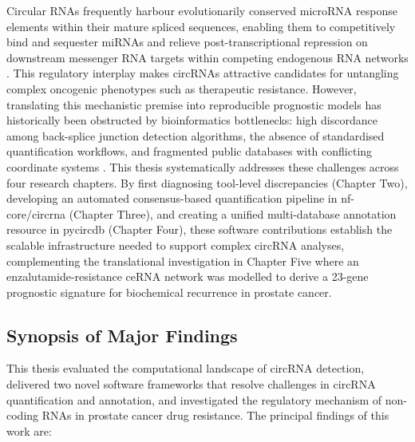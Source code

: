Circular RNAs frequently harbour evolutionarily conserved microRNA response elements within their mature spliced sequences, enabling them to competitively bind and sequester miRNAs and relieve post-transcriptional repression on downstream messenger RNA targets within competing endogenous RNA networks \cite{Hansen2013Mar, Thomas2014Aug, Denzler2014Jun}. This regulatory interplay makes circRNAs attractive candidates for untangling complex oncogenic phenotypes such as therapeutic resistance. However, translating this mechanistic premise into reproducible prognostic models has historically been obstructed by bioinformatics bottlenecks: high discordance among back-splice junction detection algorithms, the absence of standardised quantification workflows, and fragmented public databases with conflicting coordinate systems \cite{Chen2023Jan, Digby2023Dec, Digby2024Dec}. This thesis systematically addresses these challenges across four research chapters. By first diagnosing tool-level discrepancies (Chapter Two), developing an automated consensus-based quantification pipeline in nf-core/circrna (Chapter Three), and creating a unified multi-database annotation resource in pycircdb (Chapter Four), these software contributions establish the scalable infrastructure needed to support complex circRNA analyses, complementing the translational investigation in Chapter Five where an enzalutamide-resistance ceRNA network was modelled to derive a 23-gene prognostic signature for biochemical recurrence in prostate cancer.

\subsection{Synopsis of Major Findings}
This thesis evaluated the computational landscape of circRNA detection, delivered two novel software frameworks that resolve challenges in circRNA quantification and annotation, and investigated the regulatory mechanism of non-coding RNAs in prostate cancer drug resistance. The principal findings of this work are:

